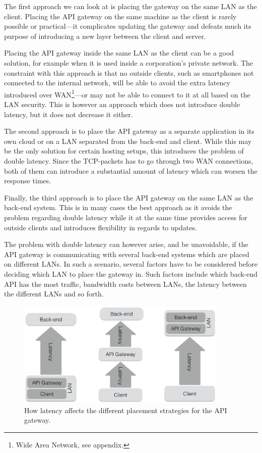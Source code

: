 \documentclass{cslthse-msc}
\begin{document}
The first approach we can look at is placing the gateway on the same LAN as the client. Placing the API gateway on the same machine as the client is rarely possible or practical---it complicates updating the gateway and defeats much its purpose of introducing a new layer between the client and server. 

Placing the API gateway inside the same LAN as the client can be a good solution, for example when it is used inside a corporation's private network. The constraint with this approach is that no outside clients, such as smartphones not connected to the internal network, will be able to avoid the extra latency introduced over WAN\footnote{Wide Area Network, see appendix.}---or may not be able to connect to it at all based on the LAN security. This is however an approach which does not introduce double latency, but it does not decrease it either.

The second approach is to place the API gateway as a separate application in its own cloud or on a LAN separated from the back-end and client. While this may be the only solution for certain hosting setups, this introduces the problem of double latency. Since the TCP-packets has to go through two WAN connections, both of them can introduce a substantial amount of latency which can worsen the response times.

Finally, the third approach is to place the API gateway on the same LAN as the back-end system. This is in many cases the best approach as it avoids the problem regarding double latency while it at the same time provides access for outside clients and introduces flexibility in regards to updates. 

The problem with double latency can however arise, and be unavoidable, if the API gateway is communicating with several back-end systems which are placed on different LANs. In such a scenario, several factors have to be considered before deciding which LAN to place the gateway in. Such factors include which back-end API has the most traffic, bandwidth costs between LANs, the latency between the different LANs and so forth.

\begin{figure}[H]
  \centering
    \begin{center}
      \includegraphics[width=0.9\textwidth]{images/api_gateway_latency.png}
    \end{center}
  \caption{How latency affects the different placement strategies for the API gateway.}
\end{figure}
\end{document}
